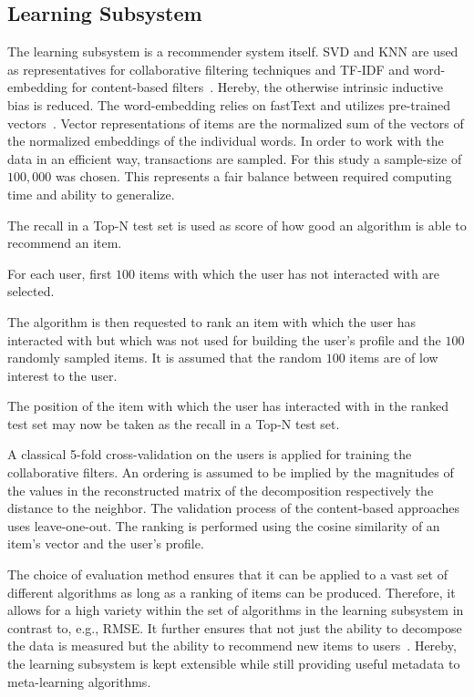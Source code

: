 \documentclass[runningheads]{llncs}
\begin{document}
\subsection{Learning Subsystem}
The learning subsystem is a recommender system itself. SVD and KNN are used as representatives for collaborative filtering techniques and TF-IDF and word-embedding for content-based filters~\cite{scikit-learn,rehurek_lrec}. Hereby, the otherwise intrinsic inductive bias is reduced. The word-embedding relies on fastText and utilizes pre-trained vectors~\cite{DBLP:journals/corr/BojanowskiGJM16}. Vector representations of items are the normalized sum of the vectors of the normalized embeddings of the individual words. In order to work with the data in an efficient way, transactions are sampled. For this study a sample-size of $100,000$ was chosen. This represents a fair balance between required computing time and ability to generalize.

The recall in a Top-N test set is used as score of how good an algorithm is able to recommend an item.
\begin{enumerate*}[label= (\arabic*)]
	\item For each user, first $100$ items with which the user has not interacted with are selected.
	\item The algorithm is then requested to rank an item with which the user has interacted with but which was not used for building the user's profile and the $100$ randomly sampled items. It is assumed that the random $100$ items are of low interest to the user.
	\item The position of the item with which the user has interacted with in the ranked test set may now be taken as the recall in a Top-N test set.
\end{enumerate*}

A classical 5-fold cross-validation on the users is applied for training the collaborative filters. An ordering is assumed to be implied by the magnitudes of the values in the reconstructed matrix of the decomposition respectively the distance to the neighbor. The validation process of the content-based approaches uses leave-one-out. The ranking is performed using the cosine similarity of an item's vector and the user's profile.

The choice of evaluation method ensures that it can be applied to a vast set of different algorithms as long as a ranking of items can be produced. Therefore, it allows for a high variety within the set of algorithms in the learning subsystem in contrast to, e.g., RMSE. It further ensures that not just the ability to decompose the data is measured but the ability to recommend new items to users~\cite{Cremonesi:2010:PRA:1864708.1864721}. Hereby, the learning subsystem is kept extensible while still providing useful metadata to meta-learning algorithms.
\end{document}
